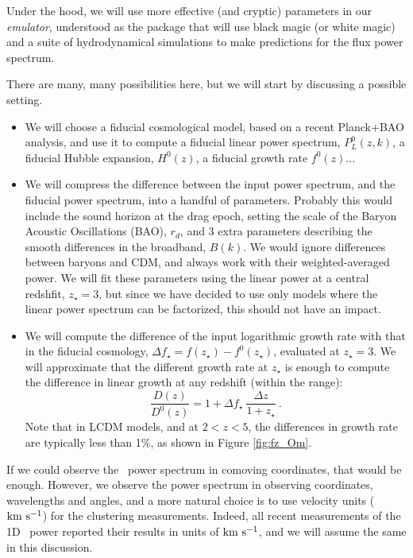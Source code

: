 Under the hood, we will use more effective (and cryptic) parameters in our 
\textit{emulator}, understood as the package that will use black magic 
(or white magic) and a suite of hydrodynamical simulations to make 
predictions for the flux power spectrum.

There are many, many possibilities here, but we will start by discussing a 
possible setting. 

\begin{itemize}
 \item We will choose a fiducial cosmological model, based on a recent 
  Planck+BAO analysis, and use it to compute a fiducial linear power spectrum,
  $P_L^0(z,k)$, a fiducial Hubble expansion, $H^0(z)$, a fiducial growth 
  rate $f^0(z)$...
 \item We will compress the difference between the input power spectrum, 
  and the fiducial power spectrum, into a handful of parameters. 
  Probably this would include the sound horizon at the drag epoch, setting 
  the scale of the Baryon Acoustic Oscillations (BAO), $r_d$, and 3 extra 
  parameters describing the smooth differences in the broadband, $B(k)$.
  We would ignore differences between baryons and CDM, and always work with 
  their weighted-averaged power. 
  We will fit these parameters using the linear power at a central redshfit,
  $z_\star=3$, but since we have decided to use only models where the 
  linear power spectrum can be factorized, this should not have an impact.
 \item We will compute the difference of the input logarithmic growth rate 
  with that in the fiducial cosmology, 
  $\Delta f_\star = f(z_\star) - f^0(z_\star)$, 
  evaluated at $z_\star=3$. 
  We will approximate that the different growth rate at $z_\star$ is 
  enough to compute the difference in linear growth at any redshift 
  (within the range):
  \begin{equation}\label{eq:growth}
   \frac{D(z)}{D^0(z)} = 1 + \Delta f_\star ~ \frac{\Delta z}{1 + z_\star} ~.
  \end{equation} 
  Note that in LCDM models, and at $2 < z < 5$, the differences in growth 
  rate are typically less than 1\%, as shown in Figure \ref{fig:fz_Om}.
\end{itemize}

If we could observe the \lya\ power spectrum in comoving coordinates, that 
would be enough. 
However, we observe the power spectrum in observing coordinates, wavelengths
and angles, and a more natural choice is to use velocity units (${\rm km~s^{-1}}$) for 
the clustering measurements. 
Indeed, all recent measurements of the 1D \lya\ power reported their results
in units of ${\rm km~s^{-1}}$, and we will assume the same in this discussion.

